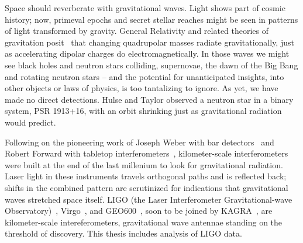 



        Space should reverberate with gravitational waves. 
Light shows part of cosmic history; now, primeval epochs and secret stellar reaches might be seen in patterns of light transformed by gravity. 
General Relativity and related theories of gravitation posit~\cite{EinsteinRosen1937} that changing quadrupolar masses radiate gravitationally, just as accelerating dipolar charges do electromagnetically. 
In those waves we might see black holes and neutron stars colliding, supernovae, the dawn of the Big Bang and rotating neutron stars -- and the potential for unanticipated insights, into other objects or laws of physics, is too tantalizing to ignore. 
As yet, we have made no direct detections. 
Hulse and Taylor \cite{HulseTaylor1975} observed a neutron star in a binary system, PSR 1913+16, with an orbit shrinking just as gravitational radiation would predict. 

Following on the pioneering work of Joseph Weber with bar detectors~\cite{Weber1960} and Robert Forward with tabletop interferometers~\cite{Forward1978}, kilometer-scale interferometers were built at the end of the last millenium to look for gravitational radiation. 
Laser light in these instruments travels orthogonal paths and is reflected back; shifts in the combined pattern are scrutinized for indications that gravitational waves stretched space itself. 
LIGO (the Laser Interferometer Gravitational-wave Observatory)~\cite{LIGOFirst2004,Fricke2009}, Virgo~\cite{Acernese2005}, and GEO600~\cite{Willke2002,Hild2009}, soon to be joined by KAGRA~\cite{Kuroda2010}, are kilometer-scale intereferometers, gravitational wave antennae standing on the threshold of discovery.
This thesis includes analysis of LIGO data.

